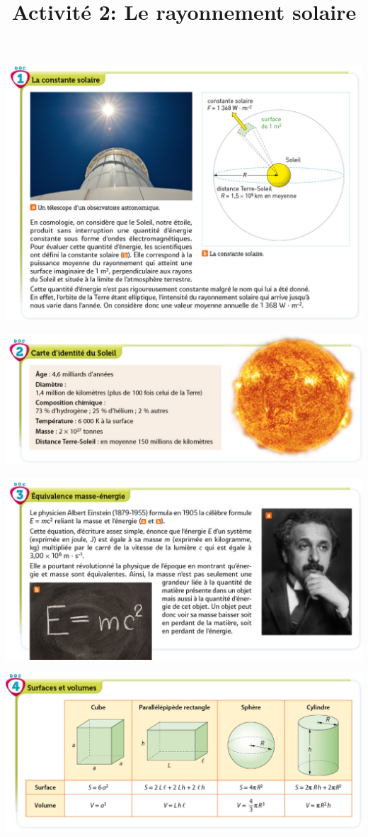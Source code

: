 \documentclass[10pt]{article}
\newcommand{\titreActivite}{Activité 2: Le rayonnement solaire} %
\begin{document}
\date{}
\title{\titreActivite}
\maketitle %
\begin{center}
	\includegraphics[scale=0.45]{assets/doc1.png}

	\includegraphics[scale=0.45]{assets/doc2.png}

	\includegraphics[scale=0.45]{assets/doc3.png}

	\includegraphics[scale=0.45]{assets/doc4.png}


\end{center}
\end{document}
